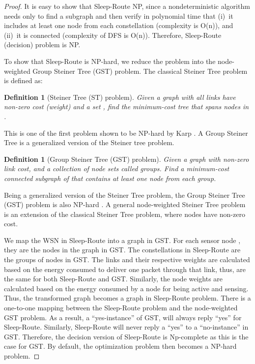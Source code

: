 \documentclass[conference]{IEEEtran}
\newtheorem{definition}[theo]{Definition}
\begin{document}
\begin{proof}
It is easy to show that Sleep-Route  NP, since a nondeterministic algorithm needs only to find a subgraph  and then verify in polynomial time that (i)~it includes at least one node from each constellation (complexity is O(n)), and (ii)~it is connected (complexity of DFS is O(n)). Therefore, Sleep-Route (decision) problem is NP.

To show that Sleep-Route is NP-hard, we reduce the problem into the node-weighted Group Steiner Tree (GST) problem. The classical Steiner Tree problem is defined as:

\begin{definition}[Steiner Tree (ST) problem] Given a graph  with all links have non-zero cost (weight) and a set , find the minimum-cost tree that spans nodes in .
\end{definition}

This is one of the first problem shown to be NP-hard by Karp \cite{karp1972reducibility}. A Group Steiner Tree is a generalized version of the Steiner tree problem.

\begin{definition}[Group Steiner Tree (GST) problem] Given a graph  with non-zero link cost, and a collection  of node sets called groups. Find a minimum-cost connected subgraph of  that contains at least one node from each group.
\end{definition}
Being a generalized version of the Steiner Tree problem, the Group Steiner Tree (GST) problem is also NP-hard \cite{ihler1999class}. A general node-weighted Steiner Tree problem is an extension of the classical Steiner Tree problem, where nodes have non-zero cost. 

We map the WSN in Sleep-Route into a graph in GST. For each sensor node , they are the nodes in the graph in GST. The constellations in Sleep-Route are the groups of nodes in GST. The links and their respective weights are calculated based on the energy consumed to deliver one packet through that link, thus, are the same for both Sleep-Route and GST. Similarly, the node weights are calculated based on the energy consumed by a node for being active and sensing. Thus, the transformed graph becomes a graph in Sleep-Route problem. There is a one-to-one mapping between the Sleep-Route problem and the node-weighted GST problem. As a result, a ``yes-instance'' of GST, will always reply ``yes'' for Sleep-Route. Similarly, Sleep-Route will never reply a ``yes'' to a ``no-instance'' in GST. Therefore, the decision version of Sleep-Route is Np-complete as this is the case for GST. By default, the optimization problem then becomes a NP-hard problem.
\end{proof}
\end{document}
